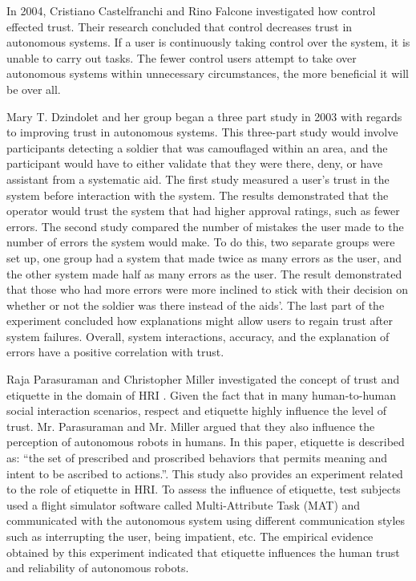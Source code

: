 \documentclass[runningheads,a4paper]{llncs}
\begin{document}
In 2004, Cristiano Castelfranchi and Rino Falcone investigated how control effected trust\cite{castelfranchi2000trust}. Their research concluded that control decreases trust in autonomous systems.  If a user is continuously taking control over the system, it is unable to carry out tasks. The fewer control users attempt to take over autonomous systems within unnecessary circumstances, the more beneficial it will be over all. 

Mary T. Dzindolet and her group began a three part study in 2003  with regards to improving trust in autonomous systems\cite{dzindolet2003role}.  This three-part study would involve participants detecting a soldier that was camouflaged within an area, and the participant would have to either validate that they were there, deny, or have assistant from a systematic aid.  The first study measured a user's trust in the system before interaction with the system.  The results demonstrated that the operator would trust the system that had higher approval ratings, such as fewer errors.  The second study compared the number of mistakes the user made to the number of errors the system would make.  To do this, two separate groups were set up,  one group had a system that made twice as many errors as the user, and the other system made half as many errors as the user.  The result demonstrated that those who had more errors were more inclined to stick with their decision on whether or not the soldier was there instead of the aids'.  The last part of the experiment concluded how explanations might allow users to regain trust after system failures.   Overall, system interactions, accuracy, and the explanation of errors have a positive correlation with trust.

Raja Parasuraman and Christopher Miller investigated the concept of trust and etiquette in the domain of HRI \cite{parasuraman2004trust}. Given the fact that in many human-to-human social interaction scenarios, respect and etiquette highly influence the level of trust. Mr. Parasuraman and Mr. Miller argued that they also influence the perception of autonomous robots in humans. In this paper, etiquette is described as: ``the set of prescribed and proscribed behaviors
that permits meaning and intent to be ascribed to
actions.''. This study also provides an experiment related to the role of etiquette in HRI. To assess the influence of etiquette, test subjects used a flight simulator software called Multi-Attribute Task (MAT) and communicated with the autonomous system using different communication styles such as interrupting the user, being impatient, etc. The empirical evidence obtained by this experiment indicated that etiquette influences the human trust and reliability of autonomous robots.
\end{document}
